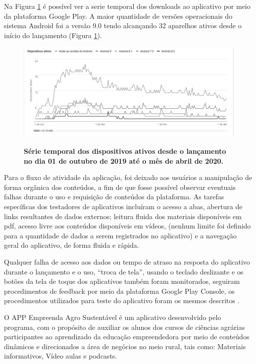 Na Figura \ref{figura_43} é possível ver a serie temporal dos downloads ao aplicativo por meio da plataforma Google Play. A maior quantidade de versões operacionais do sistema Android foi a versão 9.0 tendo alcançando 32 aparelhos ativos desde o início do lançamento (Figura \ref{figura_43}).

\begin{figure}[H]
\caption{\textbf{Série temporal dos dispositivos ativos desde o lançamento no dia 01 de outubro de 2019 até o mês de abril de 2020.}}
\centering
\includegraphics[scale=0.6]{Imagens/dispositivos_instalados.png}
\label{figura_43}
\end{figure}

Para o fluxo de atividade da aplicação, foi deixado aos usuários a manipulação de forma orgânica dos conteúdos, a fim de que fosse possível observar eventuais falhas durante o uso e requisição de conteúdos da plataforma. 
As tarefas específicas dos testadores de aplicativos incluíram o acesso a abas, abertura de links resultantes de dados externos; leitura fluida dos materiais disponíveis em pdf, acesso livre aos conteúdos disponíveis em vídeos, (nenhum limite foi definido para a quantidade de dados a serem registrados no aplicativo) e a navegação geral do aplicativo, de forma fluida e rápida.

Qualquer falha de acesso aos dados ou tempo de atraso na resposta do aplicativo durante o lançamento e o uso, “troca de tela”, usando o teclado deslizante e os botões da tela de toque dos aplicativos também foram monitorados, seguiram procedimentos de feedback por meio da plataforma Google Play Console, os procedimentos utilizados para teste do aplicativo foram os mesmos descritos .

O APP Empreenda Agro Sustentável é um aplicativo desenvolvido pelo programa, com o propósito de auxiliar os alunos dos cursos de ciências agrárias participantes ao aprendizado da educação empreendedora por meio de conteúdos dinâmicos e direcionados a área de negócios no meio rural, tais como: Materiais informativos, Vídeo aulas e podcasts.

